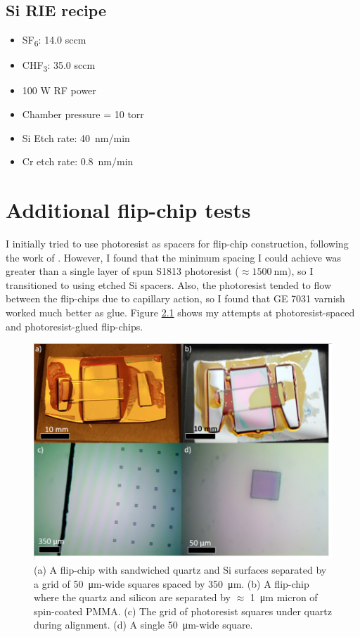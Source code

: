 \documentclass[double,12pt,1in]{beavtex}
\begin{document}
\section{Si RIE recipe}\label{Si RIE recipe}

\begin{itemize}
    \item SF\textsubscript{6}: 14.0 sccm
    \item CHF\textsubscript{3}: 35.0 sccm
    \item 100 W RF power
    \item Chamber pressure = 10 torr
    \item Si Etch rate: \SI{40}{\nano\meter/\minute}
    \item Cr etch rate: \SI{0.8}{\nano\meter/\minute}

\end{itemize}



\chapter{Additional flip-chip tests} \label{additional flip-chip tests}
I initially tried to use photoresist as spacers for flip-chip construction, following the work of \cite{bennaceur_mechanical_2015}. However, I found that the minimum spacing I could achieve was greater than a single layer of spun S1813 photoresist ($\approx \SI{1500}{\nano\meter})$, so I transitioned to using etched Si spacers. Also, the photoresist tended to flow between the flip-chips due to capillary action, so I found that GE 7031 varnish worked much better as glue. Figure \ref{PRFC} shows my attempts at photoresist-spaced and photoresist-glued flip-chips.


\begin{figure}
    \includegraphics[width = 1\textwidth]{photoresist flip-chips.png}
    \caption{(a) A flip-chip with sandwiched quartz and Si surfaces separated by a grid of \SI{50}{\micro\meter}-wide squares spaced by \SI{350}{\micro\meter}. (b) A flip-chip where the quartz and silicon are separated by $\approx$ \SI{1}{\micro\meter} micron of spin-coated PMMA. (c) The grid of photoresist squares under quartz during alignment. (d) A single \SI{50}{\micro\meter}-wide square.
    }
    \label{PRFC}
\end{figure}
\end{document}
